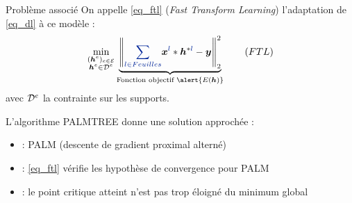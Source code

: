 \begin{frame}{Problème associé}
On appelle \eqref{eq_ftl} (\emph{Fast Transform Learning}) l'adaptation de \eqref{eq_dl} à ce modèle :
\begin{equation*}
\min_{\substack{(\h^e)_{e \in \E} \\ \h^e \in \Dspace^e}}
	\underbrace{\norm{\Beq{\sum_{l \in Feuilles}} \x^{\Beq{l}} * \h^{*\Beq{l}} -\y}{2}^2}_{\text{Fonction objectif } \alert{E(\h)}} \tag{${FTL}$} \label{eq_ftl}
\end{equation*}
avec ${\mathcal D}^e$ la contrainte sur les supports.

L'algorithme \alert{PALMTREE} donne une solution approchée :
\begin{itemize}
	\item \cite{bolte_proximal_2014} : PALM (descente de gradient proximal alterné)
	\item \cite{chabiron_toward_2015} : \eqref{eq_ftl} vérifie les hypothèse de convergence pour PALM
	\item \cite{chabiron_optimization_2016} : le point  critique atteint n'est pas trop éloigné du minimum global
\end{itemize}
\end{frame}

